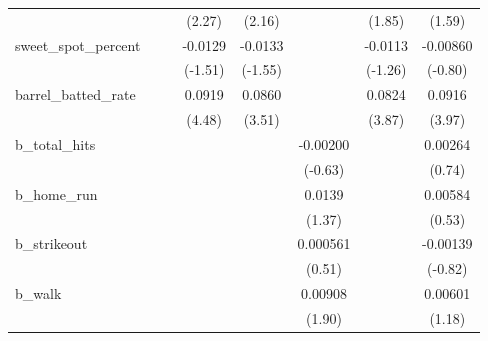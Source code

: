 {\begin{tabular}{l*{7}{c}}
            &                     &                     &      (2.27)         &      (2.16)         &                     &      (1.85)         &      (1.59)         \\
[1em]
sweet\_spot\_percent&                     &                     &     -0.0129         &     -0.0133         &                     &     -0.0113         &    -0.00860         \\
            &                     &                     &     (-1.51)         &     (-1.55)         &                     &     (-1.26)         &     (-0.80)         \\
[1em]
barrel\_batted\_rate&                     &                     &      0.0919\sym{***}&      0.0860\sym{***}&                     &      0.0824\sym{***}&      0.0916\sym{***}\\
            &                     &                     &      (4.48)         &      (3.51)         &                     &      (3.87)         &      (3.97)         \\
[1em]
b\_total\_hits&                     &                     &                     &                     &    -0.00200         &                     &     0.00264         \\
            &                     &                     &                     &                     &     (-0.63)         &                     &      (0.74)         \\
[1em]
b\_home\_run  &                     &                     &                     &                     &      0.0139         &                     &     0.00584         \\
            &                     &                     &                     &                     &      (1.37)         &                     &      (0.53)         \\
[1em]
b\_strikeout &                     &                     &                     &                     &    0.000561         &                     &    -0.00139         \\
            &                     &                     &                     &                     &      (0.51)         &                     &     (-0.82)         \\
[1em]
b\_walk      &                     &                     &                     &                     &     0.00908         &                     &     0.00601         \\
            &                     &                     &                     &                     &      (1.90)         &                     &      (1.18)         \\

\end{tabular}}
